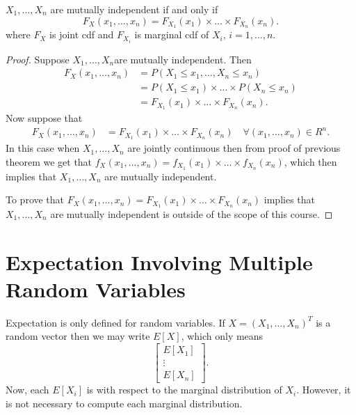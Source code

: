 
\begin{theorem}
	$X_{1} , \ldots , X_{n}$ are mutually independent if and only if  
	\[
		F_X \left( x_{1} , \ldots , x_{n} \right) = F_{X_1} \left( x_1 \right) \times \ldots \times F_{X_{n}} \left( x_{n} \right) 
	.\] 
	where $F_{X}$ is joint cdf and $F_{X_{i}}$ is marginal cdf of $X_{i}$, $i = 1, \ldots, n$. 
	\begin{proof}
		Suppose $X_{1} , \ldots , X_{n}$are mutually independent. Then
		\begin{align*}
			F_{X}\left( x_{1} , \ldots , x_{n} \right) 
			&= P\left( X_1 \le x_1, \ldots, X_{n} \le  x_{n} \right)  \\
			&= P\left( X_1 \le x_1 \right)  \times \ldots\times  P\left( X_{n} \le x_{n} \right)  \\
			&= F_{X_1} \left( x_1 \right) \times \ldots\times F_{X_{n}}\left( x_{n} \right) 			
		.\end{align*}
		Now suppose that 
		\begin{align*}
			F_{X}\left( x_{1} , \ldots , x_{n} \right) &= F_{X_1} \left( x_1 \right) \times \ldots\times F_{X_{n}}\left( x_{n} \right) \quad \forall \left( x_{1} , \ldots , x_{n} \right) \in R^{n}
		.\end{align*}
		In this case when $X_{1} , \ldots , X_{n}$ are jointly continuous then from proof of previous theorem we get that $f_{X}\left( x_{1} , \ldots , x_{n} \right) = f_{X_1}\left( x_1 \right) \times \ldots\times f_{X_{n}}\left( x_{n} \right) $, which then implies that $X_{1} , \ldots , X_{n}$ are mutually independent.  
		
To prove that $F_{X}\left( x_{1} , \ldots , x_{n} \right) = F_{X_1}\left( x_1 \right) \times \ldots \times F_{X_{n}}\left( x_{n} \right) $ implies that $X_{1} , \ldots , X_{n}$ are mutually independent is outside of the scope of this course. 
	\end{proof}
\end{theorem}

\section{Expectation Involving Multiple Random Variables}

Expectation is only defined for random variables. If $X = \left( X_{1} , \ldots , X_{n} \right) ^{T}$ is a random vector then we may write $E\left[ X \right] $, which only means
\[
\begin{bmatrix} E\left[ X_1 \right] \\ \vdots\\ E\left[ X_n \right]  \end{bmatrix}
.\] 
Now, each $E\left[ X_{i} \right] $ is with respect to the marginal distribution of $X_{i}$. However, it is not necessary to compute each marginal distribution.

